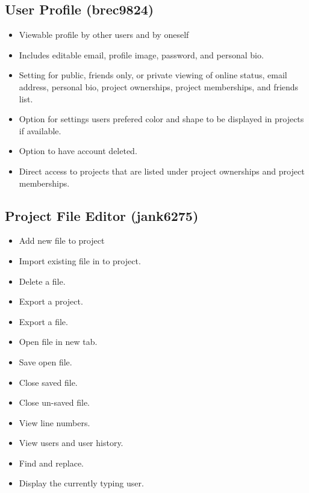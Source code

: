 \documentclass[11pt]{report}
\begin{document}
    \subsection{User Profile (brec9824)}
        \begin{itemize}
            \item Viewable profile by other users and by oneself
            \item Includes editable email, profile image, password, and personal bio.
            \item Setting for public, friends only, or private viewing of online status, email address, personal bio, project ownerships, project memberships, and friends list.
            \item Option for settings users prefered color and shape to be displayed in projects if available.
            \item Option to have account deleted.
        	\item Direct access to projects that are listed under project ownerships and project memberships.
        \end{itemize}
    \subsection{Project File Editor (jank6275)}
        \begin{itemize}
            \item Add new file to project
            \item Import existing file in to project.
            \item Delete a file.
            \item Export a project.
            \item Export a file.
            \item Open file in new tab.
            \item Save open file.
            \item Close saved file.
            \item Close un-saved file.
            \item View line numbers.
            \item View users and user history.
            \item Find and replace.
            \item Display the currently typing user.
        \end{itemize}
\end{document}
